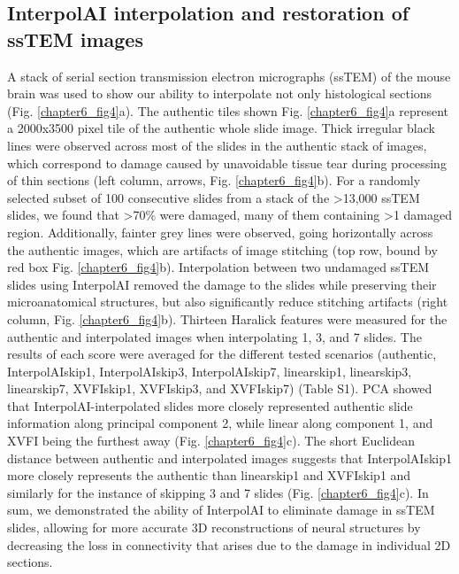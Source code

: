 \begin{refsection}
    
    \section{InterpolAI interpolation and restoration of ssTEM images}
    A stack of serial section transmission electron micrographs (ssTEM) of the mouse brain was used to show our ability to interpolate not only histological sections (Fig. \ref{chapter6_fig4}a). The authentic tiles shown Fig. \ref{chapter6_fig4}a represent a 2000x3500 pixel tile of the authentic whole slide image. Thick irregular black lines were observed across most of the slides in the authentic stack of images, which correspond to damage caused by unavoidable tissue tear during processing of thin sections (left column, arrows, Fig. \ref{chapter6_fig4}b). For a randomly selected subset of 100 consecutive slides from a stack of the >13,000 ssTEM slides, we found that >70\% were damaged, many of them containing >1 damaged region. Additionally, fainter grey lines were observed, going horizontally across the authentic images, which are artifacts of image stitching (top row, bound by red box Fig. \ref{chapter6_fig4}b). 
    Interpolation between two undamaged ssTEM slides using InterpolAI removed the damage to the slides while preserving their microanatomical structures, but also significantly reduce stitching artifacts (right column, Fig. \ref{chapter6_fig4}b).
    Thirteen Haralick features were measured for the authentic and interpolated images when interpolating 1, 3, and 7 slides. The results of each score were averaged for the different tested scenarios (authentic, InterpolAIskip1, InterpolAIskip3, InterpolAIskip7, linearskip1, linearskip3, linearskip7, XVFIskip1, XVFIskip3, and XVFIskip7) (Table S1). PCA showed that InterpolAI-interpolated slides more closely represented authentic slide information along principal component 2, while linear along component 1, and XVFI being the furthest away (Fig. \ref{chapter6_fig4}c). The short Euclidean distance between authentic and interpolated images suggests that InterpolAIskip1 more closely represents the authentic than linearskip1 and XVFIskip1 and similarly for the instance of skipping 3 and 7 slides (Fig. \ref{chapter6_fig4}c).
    In sum, we demonstrated the ability of InterpolAI to eliminate damage in ssTEM slides, allowing for more accurate 3D reconstructions of neural structures by decreasing the loss in connectivity that arises due to the damage in individual 2D sections.


\end{refsection}

